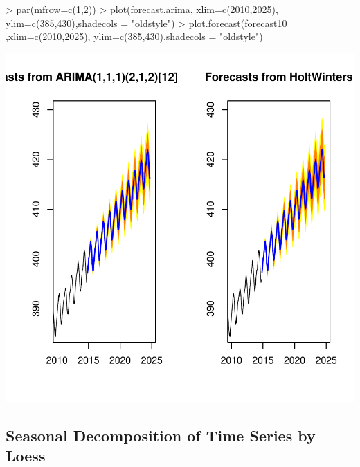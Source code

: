 \documentclass[11pt, a4paper]{article} %
\begin{document}
\begin{Schunk}
\begin{Sinput}
> par(mfrow=c(1,2))
> plot(forecast.arima, xlim=c(2010,2025), ylim=c(385,430),shadecols = "oldstyle")
> plot.forecast(forecast10 ,xlim=c(2010,2025), ylim=c(385,430),shadecols = "oldstyle")
\end{Sinput}
\end{Schunk}
\includegraphics{alleselena-074}


\subsection{Seasonal Decomposition of Time Series by Loess}
\end{document}
